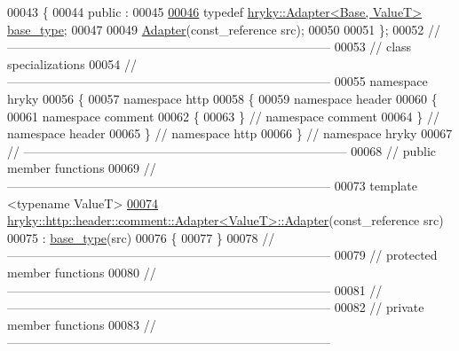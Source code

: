 \begin{DoxyCode}
00043 \{
00044 \textcolor{keyword}{public} :
00045 
\hypertarget{http__header__comment__adapter_8h_source_l00046}{}\hyperlink{classhryky_1_1http_1_1header_1_1comment_1_1_adapter_aae55ab21278edd5eb0f15405ea162ad7}{00046}     \textcolor{keyword}{typedef} \hyperlink{classhryky_1_1_adapter}{hryky::Adapter<Base, ValueT>} \hyperlink{classhryky_1_1http_1_1header_1_1comment_1_1_adapter_aae55ab21278edd5eb0f15405ea162ad7}{base_type};
00047 
00049     \hyperlink{classhryky_1_1_adapter_aad569390e8fc9963c8849cbd0c59bea9}{Adapter}(const\_reference src);
00050 
00051 \};
00052 \textcolor{comment}{//
      ------------------------------------------------------------------------------}
00053 \textcolor{comment}{// class specializations}
00054 \textcolor{comment}{//
      ------------------------------------------------------------------------------}
00055 \textcolor{keyword}{namespace }hryky
00056 \{
00057 \textcolor{keyword}{namespace }http
00058 \{
00059 \textcolor{keyword}{namespace }header
00060 \{
00061 \textcolor{keyword}{namespace }comment
00062 \{
00063 \} \textcolor{comment}{// namespace comment}
00064 \} \textcolor{comment}{// namespace header}
00065 \} \textcolor{comment}{// namespace http}
00066 \} \textcolor{comment}{// namespace hryky}
00067 \textcolor{comment}{//
      ------------------------------------------------------------------------------}
00068 \textcolor{comment}{// public member functions}
00069 \textcolor{comment}{//
      ------------------------------------------------------------------------------}
00073 \textcolor{comment}{}\textcolor{keyword}{template} <\textcolor{keyword}{typename} ValueT>
\hypertarget{http__header__comment__adapter_8h_source_l00074}{}\hyperlink{classhryky_1_1http_1_1header_1_1comment_1_1_adapter_a60a3f04c64b4ff8e8a657c3a66b31cd9}{00074} \hyperlink{classhryky_1_1_adapter_aad569390e8fc9963c8849cbd0c59bea9}{hryky::http::header::comment::Adapter<ValueT>::Adapter}(const\_reference src)
00075     : \hyperlink{classhryky_1_1_adapter}{base_type}(src)
00076 \{
00077 \}
00078 \textcolor{comment}{//
      ------------------------------------------------------------------------------}
00079 \textcolor{comment}{// protected member functions}
00080 \textcolor{comment}{//
      ------------------------------------------------------------------------------}
00081 \textcolor{comment}{//
      ------------------------------------------------------------------------------}
00082 \textcolor{comment}{// private member functions}
00083 \textcolor{comment}{//
      ------------------------------------------------------------------------------}

\end{DoxyCode}

